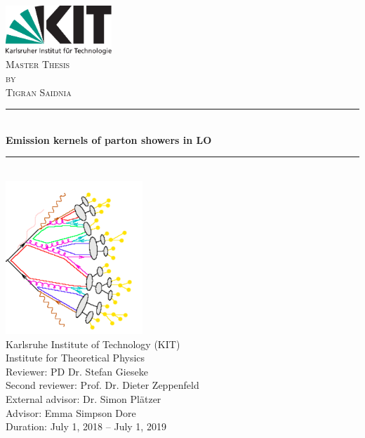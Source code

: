 \begin{titlepage}

\begin{center}


\includegraphics[width=0.3\textwidth]{images/Intro/kitlogo_de_rgb}\\[1cm]    

\textsc{\LARGE Master Thesis}\\[0.5cm]
\textsc{\Large by}\\[0.5cm]
\textsc{\Large Tigran Saidnia}\\[1.0cm]


\newcommand{\HRule}{\rule{\linewidth}{0.5mm}}
\HRule \\[1.9mm]
{\textbf{\Large \bfseries Emission kernels of parton showers in LO}}\\[0.5mm]


\HRule \\[1cm]
\includegraphics[scale=0.7]{images/Intro/footPicture.PNG}\\[0.8cm]   

\Large Karlsruhe Institute of Technology (KIT)\\[1.5mm]
\Large Institute for Theoretical Physics\\[1.0cm]

{\Large Reviewer: PD Dr. Stefan Gieseke \\
\Large Second reviewer: Prof. Dr. Dieter Zeppenfeld\\
\Large External advisor: Dr. Simon Plätzer\\
\Large Advisor: Emma Simpson Dore}\\[0.8cm]   

Duration: July 1, 2018  –  July 1, 2019

\vfill


\end{center}

\end{titlepage}